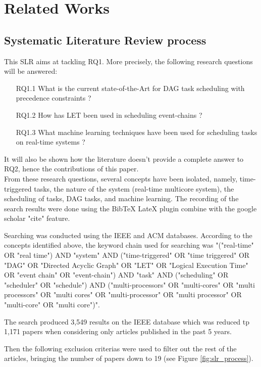 
\section{Related Works}
\label{sec:literature}

\subsection{Systematic Literature Review process}

This SLR aims at tackling RQ1. More precisely, the following research questions will be answered:

\begin{itemize}
    \item [RQ1.1] What is the current state-of-the-Art for DAG task scheduling with precedence constraints ?
    \item [RQ1.2] How has LET been used in scheduling event-chains ?
    \item [RQ1.3] What machine learning techniques have been used for scheduling tasks on real-time systems ?
\end{itemize}
It will also be shown how the literature doesn't provide 
a complete answer to RQ2, hence the contributions of this paper.\\

From these research questions, several concepts have been isolated,
namely, time-triggered tasks, the nature of the system (real-time multicore system),
the scheduling of tasks, DAG tasks, and machine learning.
The recording of the search results were done using the BibTeX LateX plugin
combine with the google scholar "cite" feature.

Searching was conducted using the IEEE and ACM databases.
According to the concepts identified above, 
the keyword chain used for searching was 
"("real-time" OR "real time") AND 
"system" AND ("time-triggered" OR "time triggered" OR "DAG" OR "Directed Acyclic Graph" OR "LET" OR "Logical Execution Time" OR "event chain" OR "event-chain") 
AND "task" 
AND ("scheduling" OR "scheduler" OR "schedule") 
AND ("multi-processors" OR "multi-cores" OR "multi processors" OR 
"multi cores" OR "multi-processor" OR "multi processor" OR 
"multi-core" OR "multi core")".

The search produced 3,549 results on the IEEE database
which was reduced tp 1,171 papers when considering only 
articles published in the past 5 years.

Then the following exclusion criterias were used to filter out 
the rest of the articles, bringing the number of papers down to 19
(see Figure \ref{fig:slr_process}).

